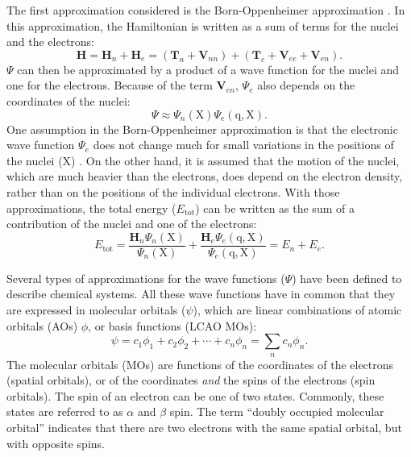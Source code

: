 The first approximation considered is the Born-Oppenheimer approximation \cite{born}. In this approximation, the Hamiltonian is written as a sum of terms for the nuclei and the electrons:
\begin{equation}
\mathbf{H} = \mathbf{H}_n + \mathbf{H}_e = (\mathbf{T}_n + \mathbf{V}_{nn}) + (\mathbf{T}_e + \mathbf{V}_{ee} + \mathbf{V}_{en}).
\label{ch1.eq.hsplit}
\end{equation}
$\Psi$ can then be approximated by a product of a wave function for the nuclei and one for the electrons. Because of the term $\mathbf{V}_{en}$, $\Psi_{e}$ also depends on the coordinates of the nuclei:
\begin{equation}
\Psi \approx \Psi_{n}(\mathrm{X}) \Psi_{e}(\mathrm{q,X}).
\end{equation}
One assumption in the Born-Oppenheimer approximation is that the electronic wave function $\Psi_{e}$ does not change much for small variations in the positions of the nuclei ($\mathrm{X}$) \cite{born}. On the other hand, it is assumed that the motion of the nuclei, which are much heavier than the electrons, does depend on the electron density, rather than on the positions of the individual electrons. With those approximations, the total energy ($E_\mathrm{tot}$) can be written as the sum of a contribution of the nuclei and one of the electrons:
\begin{equation}
E_\mathrm{tot} = \frac{\mathbf{H}_n \Psi_n(\mathrm{X})}{\Psi_n(\mathrm{X})} + \frac{\mathbf{H}_e \Psi_e(\mathrm{q,X})}{\Psi_e(\mathrm{q,X})} = E_{n} + E_{e}.
\end{equation}

Several types of approximations for the wave functions ($\Psi$) have been defined to describe chemical systems. All these wave functions have in common that they are expressed in molecular orbitals ($\psi$), which are linear combinations of atomic orbitals (AOs) $\phi$, or basis functions (LCAO MOs):
\begin{equation}
\psi = c_1 \phi_1 + c_2 \phi_2 + \cdots + c_n \phi_n = \sum_n c_n \phi_n.
\label{ch1.eq.lcaomo}
\end{equation}
The molecular orbitals (MOs) are functions of the coordinates of the electrons (spatial orbitals), or of the coordinates \textit{and} the spins of the electrons (spin orbitals). The spin of an electron can be one of two states. Commonly, these states are referred to as $\alpha$ and $\beta$ spin. The term ``doubly occupied molecular orbital'' indicates that there are two electrons with the same spatial orbital, but with opposite spins.

